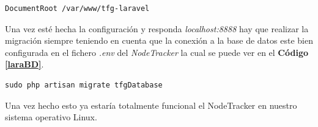 \begin{lstlisting}[caption=Asignación de directorio, label=apachelinux2]
DocumentRoot /var/www/tfg-laravel
\end{lstlisting}

Una vez esté hecha la configuración y responda \textit{localhost:8888} hay que realizar la migración siempre teniendo en cuenta que la conexión a la base de datos este bien configurada en el fichero \textit{.env} del \textit{NodeTracker} la cual se puede ver en el \textbf{Código \ref{laraBD}}.

\begin{lstlisting}[caption=Migración en Debian, label=debphpmigrate]
sudo php artisan migrate tfgDatabase
\end{lstlisting}

Una vez hecho esto ya estaría totalmente funcional el NodeTracker en nuestro sistema operativo Linux.
